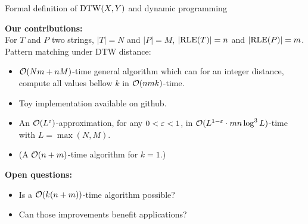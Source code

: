 \begin{frame}{Formal definition of $\mathrm{DTW}(X,Y)$ and dynamic programming}
  
\end{frame}
  

\begin{frame}{}

  \textbf{Our contributions:}\\
  For $T$ and $P$ two strings, $|T|=N$ and  $|P|=M$, $|\mathrm{RLE}(T)|=n$ and  $|\mathrm{RLE}(P)|=m$.
  Pattern matching under DTW distance:
  \begin{itemize}
  \item $\mathcal{O}(Nm+nM)$-time general algorithm which can for an integer distance, compute all values bellow $k$ in $\mathcal{O}(nmk)$-time. \pause
  \item Toy implementation available on github.\pause
  \item An $\mathcal{O}(L^{\varepsilon})$-approximation, for any $0 < \varepsilon < 1$, in  $\mathcal{O}(L^{1-\varepsilon} \cdot mn \log^3 L)$-time with $L=\max(N,M)$.\pause
  \item (A $\mathcal{O}(n+m)$-time algorithm for $k=1$.)\pause
  \end{itemize}
  
  
  \textbf{Open questions:}
  \begin{itemize}
  \item Is a $\mathcal{O}(k(n+m))$-time algorithm possible? \pause
  \item Can those improvements benefit applications?\pause
  \end{itemize}
  \end{frame}


 

